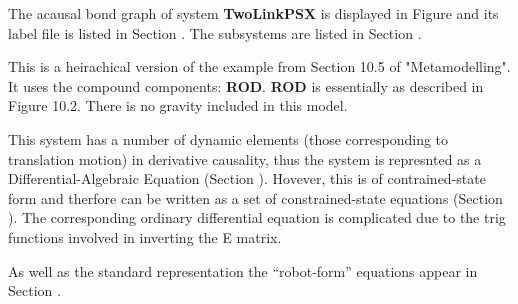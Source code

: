
%

   The acausal bond graph of system \textbf{TwoLinkPSX} is
   displayed in Figure  and its label
   file is listed in Section .
   The subsystems are listed in Section .

This is a heirachical version of the example from Section 10.5 of
"Metamodelling".  It uses the compound components: {\bf ROD}.  {\bf
ROD} is essentially as described in Figure 10.2.
There is no gravity included in this model.

This system has a number of dynamic elements (those corresponding to translation
motion) in derivative causality, thus the system is represnted as a
Differential-Algebraic Equation (Section
). Hovever, this is of contrained-state form and
therfore can be written as a set of constrained-state equations (Section
). The corresponding ordinary differential
equation is complicated due to the trig functions involved in
inverting the E matrix.

As well as the standard representation the ``robot-form'' equations
appear in Section  . 

